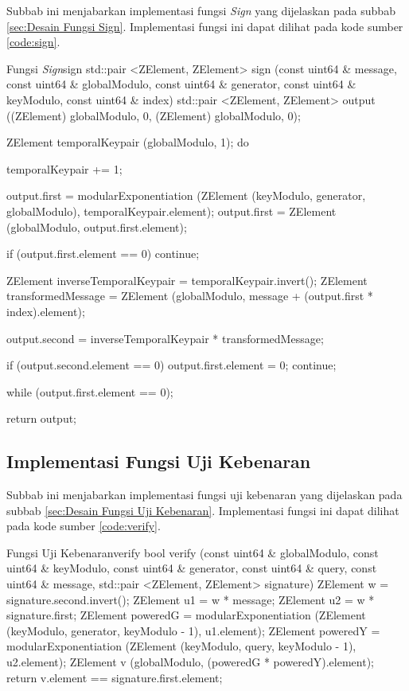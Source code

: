 Subbab ini menjabarkan implementasi fungsi \textit{Sign} yang dijelaskan pada subbab \ref{sec:Desain Fungsi Sign}. Implementasi fungsi ini dapat dilihat pada kode sumber \ref{code:sign}.
\begin{code}[firstnumber=0, float]{Fungsi \textit{Sign}}{sign}
std::pair <ZElement, ZElement> sign (const uint64 & message, const uint64 & globalModulo, const uint64 & generator, const uint64 & keyModulo, const uint64 & index) 
std::pair <ZElement, ZElement> output ((ZElement) {globalModulo, 0}, (ZElement) {globalModulo, 0});

ZElement temporalKeypair (globalModulo, 1);
do
{
	temporalKeypair += 1;
	
	output.first = modularExponentiation (ZElement (keyModulo, generator, globalModulo), temporalKeypair.element);
	output.first = ZElement (globalModulo, output.first.element);
	
	if (output.first.element == 0)
	{
		continue;
	}
	
	ZElement inverseTemporalKeypair = temporalKeypair.invert();
	ZElement transformedMessage = ZElement (globalModulo, message + (output.first * index).element);
	
	output.second = inverseTemporalKeypair * transformedMessage;
	
	if (output.second.element == 0)
	{
		output.first.element = 0;
		continue;
	}
} while (output.first.element == 0);

return output;
\end{code}

\subsection{Implementasi Fungsi Uji Kebenaran}

Subbab ini menjabarkan implementasi fungsi uji kebenaran yang dijelaskan pada subbab \ref{sec:Desain Fungsi Uji Kebenaran}. Implementasi fungsi ini dapat dilihat pada kode sumber \ref{code:verify}.
\begin{code}[firstnumber=0]{Fungsi Uji Kebenaran}{verify}
bool verify (const uint64 & globalModulo, const uint64 & keyModulo, const uint64 & generator, const uint64 & query, const uint64 & message, std::pair <ZElement, ZElement> signature)
ZElement w = signature.second.invert();
ZElement u1 = w * message;
ZElement u2 = w * signature.first;
ZElement poweredG = modularExponentiation (ZElement (keyModulo, generator, keyModulo - 1), u1.element);
ZElement poweredY = modularExponentiation (ZElement (keyModulo, query, keyModulo - 1), u2.element);
ZElement v (globalModulo, (poweredG * poweredY).element);
return v.element == signature.first.element;
\end{code}

